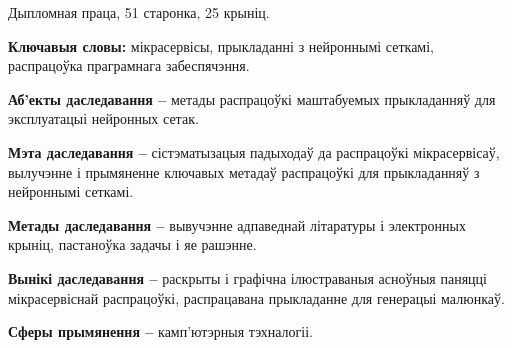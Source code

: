 Дыпломная праца, 51 старонка, 25 крыніц.

\textbf{Ключавыя словы:} мікрасервісы, прыкладанні з нейроннымі сеткамі, распрацоўка праграмнага забеспячэння.

\textbf{Аб'екты даследавання --} метады распрацоўкі маштабуемых прыкладанняў для эксплуатацыі нейронных сетак.

\textbf{Мэта даследавання --} сістэматызацыя падыходаў да распрацоўкі мікрасервісаў, вылучэнне і прымяненне ключавых метадаў распрацоўкі для прыкладанняў з нейроннымі сеткамі.

\textbf{Метады даследавання --} вывучэнне адпаведнай літаратуры і электронных крыніц, пастаноўка задачы і яе рашэнне.

\textbf{Вынікі даследавання --} раскрыты і графічна ілюстраваныя асноўныя паняцці мікрасервіснай распрацоўкі, распрацавана прыкладанне для генерацыі малюнкаў.

\textbf{Сферы прымянення --} камп'ютэрныя тэхналогіі.

\newpage